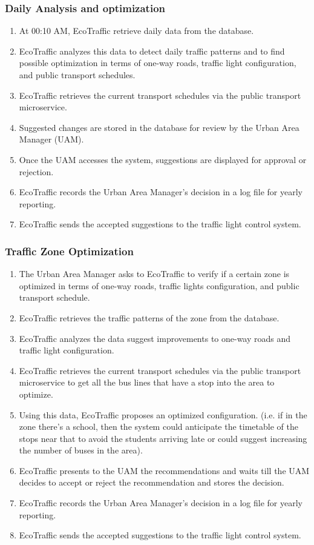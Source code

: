 \documentclass[12pt, a4paper, twoside, openright]{report}
\begin{document}
\subsubsection{Daily Analysis and optimization}\label{subsubsec:daily-analysis}

\begin{enumerate}
\item
  At 00:10 AM, EcoTraffic retrieve daily data from the
  database.
\item
  EcoTraffic analyzes this data to detect daily traffic patterns and to
  find possible optimization in terms of one-way roads, traffic light
  configuration, and public transport schedules.
\item
  EcoTraffic retrieves the current transport schedules via the public transport microservice.
\item
  Suggested changes are stored in the database for review by the Urban Area Manager (UAM).
\item
  Once the UAM accesses the system, suggestions are displayed for approval or rejection.
\item
  EcoTraffic records the Urban Area Manager's decision in a log file for yearly reporting.
\item
  EcoTraffic sends the accepted suggestions to the traffic light control system.
\end{enumerate}

\subsubsection{Traffic Zone Optimization}\label{subsubsec:traffic-zone}

\begin{enumerate}
\item
  The Urban Area Manager asks to EcoTraffic to verify if a certain zone
  is optimized in terms of one-way roads, traffic lights configuration,
  and public transport schedule.
\item
  EcoTraffic retrieves the traffic patterns of the
  zone from the database.
\item
  EcoTraffic analyzes the data suggest improvements to one-way roads and traffic light configuration.
\item
  EcoTraffic retrieves the current transport schedules via the public transport microservice
  to get all the bus lines that have a stop
  into the area to optimize.
\item
  Using this data, EcoTraffic proposes an optimized configuration. (i.e.
  if in the zone there's a school, then the system could anticipate the
  timetable of the stops near that to avoid the students arriving late
  or could suggest increasing the number of buses in the area).
\item
  EcoTraffic presents to the UAM the recommendations and waits till the
  UAM decides to accept or reject the recommendation and stores the
  decision.
\item
  EcoTraffic records the Urban Area Manager's decision in a log file for yearly reporting.
\item
  EcoTraffic sends the accepted suggestions to the traffic light control system.
\end{enumerate}
\end{document}
